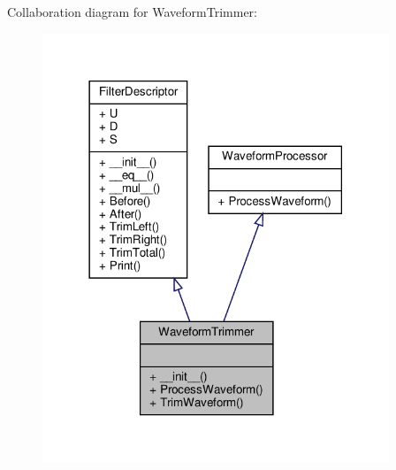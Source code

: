 Collaboration diagram for Waveform\+Trimmer\+:\nopagebreak
\begin{figure}[H]
\begin{center}
\leavevmode
\includegraphics[width=294pt]{classSignalIntegrity_1_1TimeDomain_1_1Filters_1_1WaveformTrimmer_1_1WaveformTrimmer__coll__graph}
\end{center}
\end{figure}
